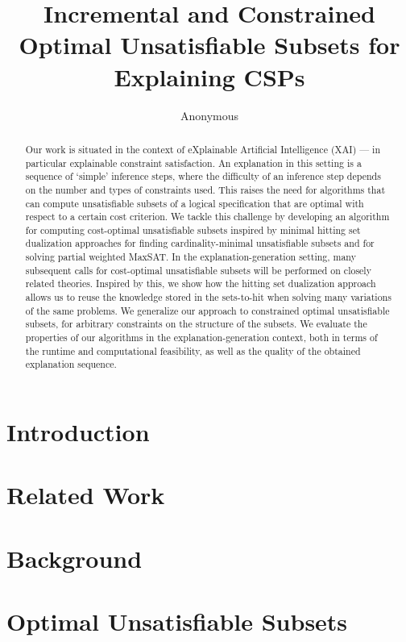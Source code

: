 \documentclass[letterpaper]{article} %
\title{Incremental and Constrained Optimal Unsatisfiable Subsets for Explaining CSPs}
\author{Anonymous}
\newcommand\comment[1]{\marginpar{\parbox{\marginparwidth-20pt}{\tiny #1}}}
\newcommand{\todo}[1]{{\comment{\color{red}\textsc{TODO:}#1} }}
\renewcommand{\todo}[1]{{\comment{\color{red}\textsc{TODO:}#1} }}
\begin{document}
\maketitle

\begin{abstract}
Our work is situated in the context of eXplainable Artificial Intelligence (XAI) --- in particular explainable constraint satisfaction.
An explanation in this setting is a sequence of `simple' inference steps, where the difficulty of an inference step depends on the number and types of constraints used.
This raises the need for algorithms that can compute unsatisfiable subsets of a logical specification that are optimal with respect to a certain cost criterion.
We tackle this challenge by developing an algorithm for computing cost-optimal unsatisfiable subsets inspired by minimal hitting set dualization approaches for finding cardinality-minimal unsatisfiable subsets and for solving partial weighted MaxSAT.
In the explanation-generation setting, many subsequent calls for cost-optimal unsatisfiable subsets will be performed on closely related theories.
Inspired by this, we show how the hitting set dualization approach allows us to reuse the knowledge stored in the sets-to-hit when solving many variations of the same problems.
We generalize our approach to constrained optimal unsatisfiable subsets, for arbitrary constraints on the structure of the subsets.
We evaluate the properties of our algorithms in the explanation-generation context, both in terms of the runtime and computational feasibility, as well as the quality of the obtained explanation sequence.
\end{abstract}

\section{Introduction}

\section{Related Work}\label{sec:related}

\section{Background}\label{sec:backgr}\label{sec:background}


\section{Optimal Unsatisfiable Subsets}\label{sec:omus}

\end{document}
